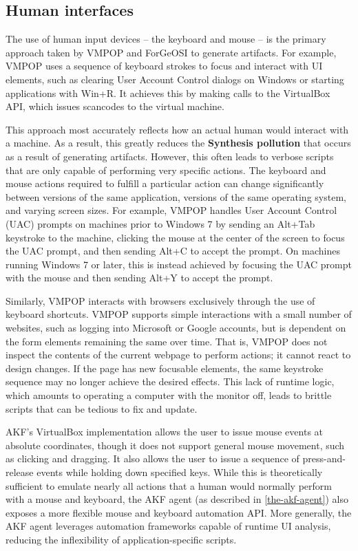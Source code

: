 \documentclass[letterpaper,12pt]{report}
\begin{document}
\subsection{Human interfaces}\label{human-interfaces}

The use of human input devices -- the keyboard and mouse -- is the
primary approach taken by VMPOP \cite{parkTREDEVMPOPCultivating2018}
and ForGeOSI \cite{maxfraggMaxfraggForGeOSI2023} to generate
artifacts. For example, VMPOP uses a sequence of keyboard strokes to
focus and interact with UI elements, such as clearing User Account
Control dialogs on Windows or starting applications with Win+R. It
achieves this by making calls to the VirtualBox API, which issues
scancodes to the virtual machine.

This approach most accurately reflects how an actual human would
interact with a machine. As a result, this greatly reduces the
\textbf{Synthesis pollution} that occurs as a result of generating
artifacts. However, this often leads to verbose scripts that are only
capable of performing very specific actions. The keyboard and mouse
actions required to fulfill a particular action can change significantly
between versions of the same application, versions of the same operating
system, and varying screen sizes. For example, VMPOP handles User
Account Control (UAC) prompts on machines prior to Windows 7 by sending
an Alt+Tab keystroke to the machine, clicking the mouse at the center of
the screen to focus the UAC prompt, and then sending Alt+C to accept the
prompt. On machines running Windows 7 or later, this is instead achieved
by focusing the UAC prompt with the mouse and then sending Alt+Y to
accept the prompt.

Similarly, VMPOP interacts with browsers exclusively through the use of
keyboard shortcuts. VMPOP supports simple interactions with a small
number of websites, such as logging into Microsoft or Google accounts,
but is dependent on the form elements remaining the same over time. That
is, VMPOP does not inspect the contents of the current webpage to
perform actions; it cannot react to design changes. If the page has new
focusable elements, the same keystroke sequence may no longer achieve
the desired effects. This lack of runtime logic, which amounts to
operating a computer with the monitor off, leads to brittle scripts that
can be tedious to fix and update.

AKF's VirtualBox implementation allows the user to issue mouse events at
absolute coordinates, though it does not support general mouse movement,
such as clicking and dragging. It also allows the user to issue a
sequence of press-and-release events while holding down specified keys.
While this is theoretically sufficient to emulate nearly all actions
that a human would normally perform with a mouse and keyboard, the AKF
agent (as described in \autoref{the-akf-agent}) also exposes a more flexible mouse and keyboard automation API.
More generally, the AKF agent leverages automation frameworks capable of
runtime UI analysis, reducing the inflexibility of application-specific
scripts.
\end{document}

